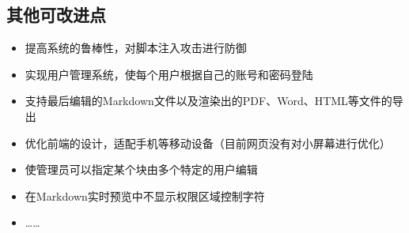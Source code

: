 \documentclass[11pt]{ctexart}
\begin{document}
\subsection{其他可改进点}
\begin{itemize}
    \item 提高系统的鲁棒性，对脚本注入攻击进行防御
    \item 实现用户管理系统，使每个用户根据自己的账号和密码登陆
    \item 支持最后编辑的Markdown文件以及渲染出的PDF、Word、HTML等文件的导出
    \item 优化前端的设计，适配手机等移动设备（目前网页没有对小屏幕进行优化）
    \item 使管理员可以指定某个块由多个特定的用户编辑
    \item 在Markdown实时预览中不显示权限区域控制字符
    \item ……
\end{itemize}

\clearpage

\nocite{*}


\end{document}
